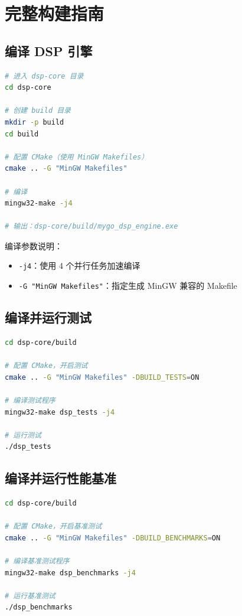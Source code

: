 ﻿\documentclass[12pt,a4paper,oneside]{ctexbook}
\begin{document}
\section{完整构建指南}

\subsection{编译 DSP 引擎}

\begin{lstlisting}[language=bash, caption={编译 DSP 引擎}]
# 进入 dsp-core 目录
cd dsp-core

# 创建 build 目录
mkdir -p build
cd build

# 配置 CMake（使用 MinGW Makefiles）
cmake .. -G "MinGW Makefiles"

# 编译
mingw32-make -j4

# 输出：dsp-core/build/mygo_dsp_engine.exe
\end{lstlisting}

编译参数说明：
\begin{itemize}
    \item \texttt{-j4}：使用 4 个并行任务加速编译
    \item \texttt{-G "MinGW Makefiles"}：指定生成 MinGW 兼容的 Makefile
\end{itemize}

\subsection{编译并运行测试}

\begin{lstlisting}[language=bash, caption={编译和运行 Google Test}]
cd dsp-core/build

# 配置 CMake，开启测试
cmake .. -G "MinGW Makefiles" -DBUILD_TESTS=ON

# 编译测试程序
mingw32-make dsp_tests -j4

# 运行测试
./dsp_tests
\end{lstlisting}

\subsection{编译并运行性能基准}

\begin{lstlisting}[language=bash, caption={编译和运行基准测试}]
cd dsp-core/build

# 配置 CMake，开启基准测试
cmake .. -G "MinGW Makefiles" -DBUILD_BENCHMARKS=ON

# 编译基准测试程序
mingw32-make dsp_benchmarks -j4

# 运行基准测试
./dsp_benchmarks
\end{lstlisting}
\end{document}
